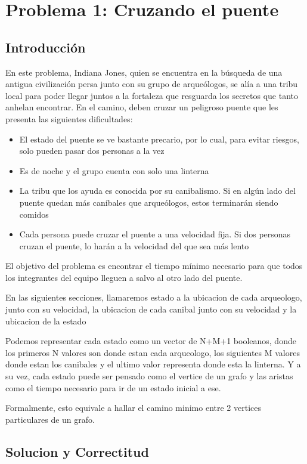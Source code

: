 \section{Problema 1: Cruzando el puente}

\subsection{Introducción}
	En este problema, Indiana Jones, quien se encuentra en la búsqueda de una antigua civilización persa junto con su grupo de arqueólogos, se alía a una tribu local para poder llegar juntos a la fortaleza que resguarda los secretos que tanto anhelan encontrar. En el camino, deben cruzar un peligroso puente que les presenta las siguientes dificultades:
	\begin{itemize}
	\item El estado del puente se ve bastante precario, por lo cual, para evitar riesgos, solo pueden pasar dos personas a la vez
	\item Es de noche y el grupo cuenta con solo una linterna
	\item La tribu que los ayuda es conocida por su canibalismo. Si en algún lado del puente quedan más caníbales que arqueólogos, estos terminarán siendo comidos
	\item Cada persona puede cruzar el puente a una velocidad fija. Si dos personas cruzan el puente, lo harán a la velocidad del que sea más lento
	\end{itemize}
	El objetivo del problema es encontrar el tiempo mínimo necesario para que todos los integrantes del equipo lleguen a salvo al otro lado del puente.

	En las siguientes secciones, llamaremos estado a la ubicacion de cada arqueologo, junto con su velocidad, la ubicacion de cada canibal junto con su velocidad y la ubicacion de la estado

	Podemos representar cada estado como un vector de N+M+1 booleanos, donde los primeros N valores son donde estan cada arqueologo, los siguientes M valores donde estan los canibales y el ultimo valor representa donde esta la linterna. Y a su vez, cada estado puede ser pensado como el vertice de un grafo y las aristas como el tiempo necesario para ir de un estado inicial a ese.	

	Formalmente, esto equivale a hallar el camino minimo entre 2 vertices particulares de un grafo.

\subsection{Solucion y Correctitud}	
	

